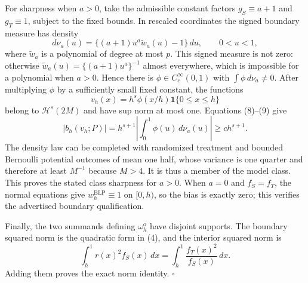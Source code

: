 For sharpness when \(a>0\), take the admissible constant factors \(g_S\equiv a+1\) and \(g_T\equiv1\), subject to the fixed bounds. In rescaled coordinates the signed boundary measure has density
\[
d\nu_a(u)=\{(a+1)u^a\widetilde w_a(u)-1\}\,du,
\qquad 0<u<1,
\tag{8}
\]
where \(\widetilde w_a\) is a polynomial of degree at most \(p\). This signed measure is not zero: otherwise \(\widetilde w_a(u)=\{(a+1)u^a\}^{-1}\) almost everywhere, which is impossible for a polynomial when \(a>0\). Hence there is \(\phi\in C_c^\infty(0,1)\) with \(\int\phi\,d\nu_a\ne0\). After multiplying \(\phi\) by a sufficiently small fixed constant, the functions
\[
v_h(x)=h^s\phi(x/h)\mathbf 1\{0\le x\le h\}
\tag{9}
\]
belong to \(\mathcal H^s(2M)\) and have sup norm at most one. Equations (8)--(9) give
\[
|b_h(v_h;P)|=h^{s+1}\left|\int_0^1\phi(u)\,d\nu_a(u)\right|\ge ch^{s+1}.
\tag{10}
\]
The density law can be completed with randomized treatment and bounded Bernoulli potential outcomes of mean one half, whose variance is one quarter and therefore at least \(M^{-1}\) because \(M>4\). It is thus a member of the model class. This proves the stated class sharpness for \(a>0\). When \(a=0\) and \(f_S=f_T\), the normal equations give \(w_h^{\mathrm{BLP}}\equiv1\) on \([0,h)\), so the bias is exactly zero; this verifies the advertised boundary qualification.

Finally, the two summands defining \(\omega_h^{\mathrm o}\) have disjoint supports. The boundary squared norm is the quadratic form in (4), and the interior squared norm is
\[
\int_h^1r(x)^2f_S(x)\,dx=\int_h^1\frac{f_T(x)^2}{f_S(x)}\,dx.
\]
Adding them proves the exact norm identity. \(\square\)